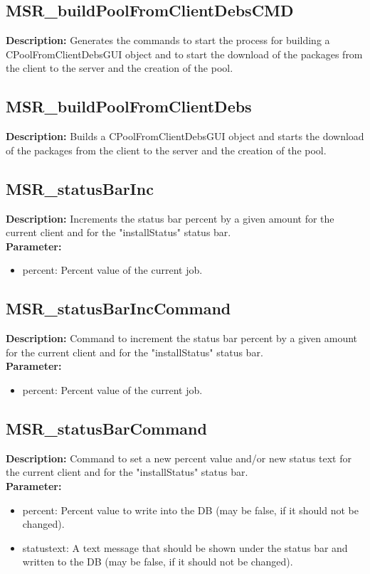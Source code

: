 \subsection{MSR\_buildPoolFromClientDebsCMD}
\textbf{Description:} Generates the commands to start the process for building a CPoolFromClientDebsGUI object and to start the download of the packages from the client to the server and the creation of the pool.\\

\subsection{MSR\_buildPoolFromClientDebs}
\textbf{Description:} Builds a CPoolFromClientDebsGUI object and starts the download of the packages from the client to the server and the creation of the pool.\\

\subsection{MSR\_statusBarInc}
\textbf{Description:} Increments the status bar percent by a given amount for the current client and for the "installStatus" status bar.\\
\textbf{Parameter:}
\begin{itemize}
\item percent: Percent value of the current job.
\end{itemize}

\subsection{MSR\_statusBarIncCommand}
\textbf{Description:} Command to increment the status bar percent by a given amount for the current client and for the "installStatus" status bar.\\
\textbf{Parameter:}
\begin{itemize}
\item percent: Percent value of the current job.
\end{itemize}

\subsection{MSR\_statusBarCommand}
\textbf{Description:} Command to set a new percent value and/or new status text for the current client and for the "installStatus" status bar.\\
\textbf{Parameter:}
\begin{itemize}
\item percent: Percent value to write into the DB (may be false, if it should not be changed).
\item statustext: A text message that should be shown under the status bar and written to the DB (may be false, if it should not be changed).
\end{itemize}

